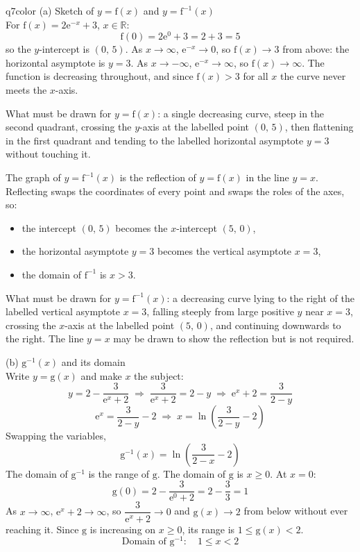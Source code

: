 \documentclass[11pt,a4paper]{article}
\begin{document}
\begin{ansbox}{q7color}
(a) Sketch of $y = \mathrm{f}(x)$ and $y = \mathrm{f}^{-1}(x)$\\[4pt]
For $\mathrm{f}(x) = 2\mathrm{e}^{-x} + 3$, $x \in \mathbb{R}$:
\[
\mathrm{f}(0) = 2\mathrm{e}^{0} + 3 = 2 + 3 = 5
\]
so the $y$-intercept is $(0,\,5)$. As $x \to \infty$, $\mathrm{e}^{-x} \to 0$, so $\mathrm{f}(x) \to 3$ from above: the horizontal asymptote is $y = 3$. As $x \to -\infty$, $\mathrm{e}^{-x} \to \infty$, so $\mathrm{f}(x) \to \infty$. The function is decreasing throughout, and since $\mathrm{f}(x) > 3$ for all $x$ the curve never meets the $x$-axis.

What must be drawn for $y = \mathrm{f}(x)$: a single decreasing curve, steep in the second quadrant, crossing the $y$-axis at the labelled point $(0,\,5)$, then flattening in the first quadrant and tending to the labelled horizontal asymptote $y = 3$ without touching it.

The graph of $y = \mathrm{f}^{-1}(x)$ is the reflection of $y = \mathrm{f}(x)$ in the line $y = x$. Reflecting swaps the coordinates of every point and swaps the roles of the axes, so:
\begin{itemize}[nosep]
\item the intercept $(0,\,5)$ becomes the $x$-intercept $(5,\,0)$,
\item the horizontal asymptote $y = 3$ becomes the vertical asymptote $x = 3$,
\item the domain of $\mathrm{f}^{-1}$ is $x > 3$.
\end{itemize}
What must be drawn for $y = \mathrm{f}^{-1}(x)$: a decreasing curve lying to the right of the labelled vertical asymptote $x = 3$, falling steeply from large positive $y$ near $x = 3$, crossing the $x$-axis at the labelled point $(5,\,0)$, and continuing downwards to the right. The line $y = x$ may be drawn to show the reflection but is not required.

(b) $\mathrm{g}^{-1}(x)$ and its domain\\[4pt]
Write $y = \mathrm{g}(x)$ and make $x$ the subject:
\[
y = 2 - \frac{3}{\mathrm{e}^{x} + 2} \;\Rightarrow\; \frac{3}{\mathrm{e}^{x}+2} = 2 - y \;\Rightarrow\; \mathrm{e}^{x} + 2 = \frac{3}{2-y}
\]
\[
\mathrm{e}^{x} = \frac{3}{2-y} - 2 \;\Rightarrow\; x = \ln\left(\frac{3}{2-y} - 2\right)
\]
Swapping the variables,
\[
\boxed{\mathrm{g}^{-1}(x) = \ln\left(\frac{3}{2-x} - 2\right)}
\]
The domain of $\mathrm{g}^{-1}$ is the range of $\mathrm{g}$. The domain of $\mathrm{g}$ is $x \ge 0$. At $x = 0$:
\[
\mathrm{g}(0) = 2 - \frac{3}{\mathrm{e}^{0}+2} = 2 - \frac{3}{3} = 1
\]
As $x \to \infty$, $\mathrm{e}^{x} + 2 \to \infty$, so $\dfrac{3}{\mathrm{e}^{x}+2} \to 0$ and $\mathrm{g}(x) \to 2$ from below without ever reaching it. Since $\mathrm{g}$ is increasing on $x \ge 0$, its range is $1 \le \mathrm{g}(x) < 2$.
\[
\text{Domain of } \mathrm{g}^{-1}: \quad \boxed{1 \le x < 2}
\]
\end{ansbox}
\end{document}
